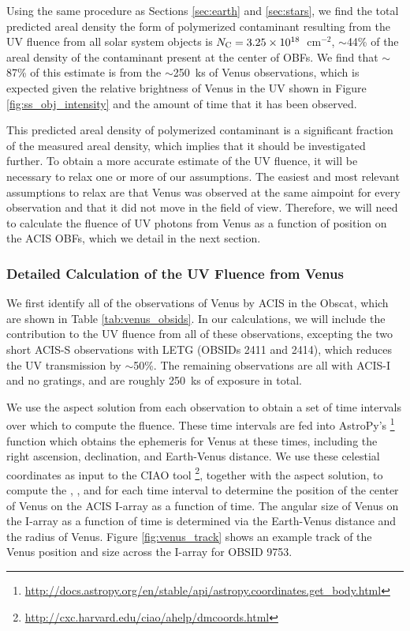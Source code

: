 \documentclass[11pt]{article}
\begin{document}


Using the same procedure as Sections \ref{sec:earth} and \ref{sec:stars}, we find the total predicted areal density
the form of polymerized contaminant resulting from the UV fluence from all solar system objects is $N_{\rm C} =
3.25 \times 10^{18}$~cm$^{-2}$, $\sim$44\% of the areal density of the contaminant present at the center of OBFs. We find that
$\sim$87\% of this estimate is from the $\sim$250~ks of Venus observations, which is expected given the relative
brightness of Venus in the UV shown in Figure \ref{fig:ss_obj_intensity} and the amount of time that it has been observed.

This predicted areal density of polymerized contaminant is a significant fraction of the measured areal density, which implies
that it should be investigated further. To obtain a more accurate estimate of the UV fluence, it will be necessary to
relax one or more of our assumptions. The easiest and most relevant assumptions to relax are that Venus was observed at
the same aimpoint for every observation and that it did not move in the field of view. Therefore, we will need to calculate
the fluence of UV photons from Venus as a function of position on the ACIS OBFs, which we detail in the next section.

\subsubsection{Detailed Calculation of the UV Fluence from Venus}\label{sec:venus}

We first identify all of the observations of Venus by ACIS in the Obscat, which are shown in Table \ref{tab:venus_obsids}.
In our calculations, we will include the contribution to the UV fluence from all of these observations, excepting the
two short ACIS-S observations with LETG (OBSIDs 2411 and 2414), which reduces the UV transmission by $\sim$50\%. The
remaining observations are all with ACIS-I and no gratings, and are roughly 250~ks of exposure in total.



We use the aspect solution from each observation to obtain a set of time intervals over which to compute the fluence.
These time intervals are fed into AstroPy's
\footnote{\url{http://docs.astropy.org/en/stable/api/astropy.coordinates.get_body.html}}
function which obtains the ephemeris for Venus at these times, including the right ascension, declination, and
Earth-Venus distance. We use these celestial coordinates as input to the CIAO tool
\footnote{\url{http://cxc.harvard.edu/ciao/ahelp/dmcoords.html}}, together with the aspect solution,
to compute the , , and  for each time interval to determine the position of
the center of Venus on the ACIS I-array as a function of time. The angular size of Venus on the I-array as a function
of time is determined via the Earth-Venus distance and the radius of Venus. Figure \ref{fig:venus_track} shows
an example track of the Venus position and size across the I-array for OBSID 9753.
\end{document}

